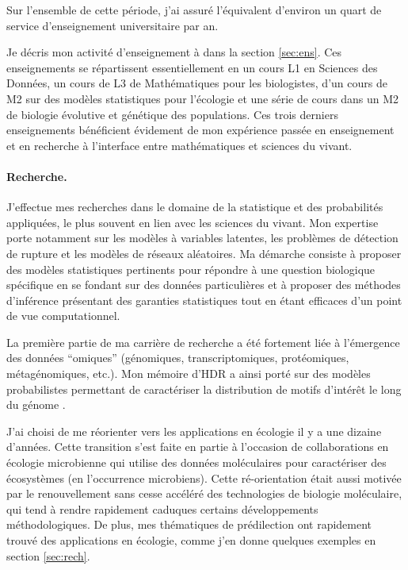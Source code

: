 Sur l'ensemble de cette période, j'ai assuré l'équivalent d'environ un quart de service d'enseignement universitaire par an.

\bigskip
Je décris mon activité d’enseignement à \SU dans la section \ref{sec:ens}. Ces enseignements se répartissent essentiellement en un cours L1 en Sciences des Données, un cours de L3 de Mathématiques pour les biologistes, d’un cours de M2 sur des modèles statistiques pour l’écologie et une série de cours dans un M2 de biologie évolutive et génétique des populations. Ces trois derniers enseignements bénéficient évidement de mon expérience passée en enseignement et en recherche à l’interface entre mathématiques et sciences du vivant.

\paragraph{Recherche.}
J’effectue mes recherches dans le domaine de la statistique et des probabilités appliquées, le plus souvent en lien avec les sciences du vivant. Mon expertise porte notamment sur les modèles à variables latentes, les problèmes de détection de rupture et les modèles de réseaux aléatoires. Ma démarche consiste à proposer des modèles statistiques pertinents pour répondre à une question biologique spécifique en se fondant sur des données particulières et à proposer des méthodes d’inférence présentant des garanties statistiques tout en étant efficaces d’un point de vue computationnel.

\bigskip
La première partie de ma carrière de recherche a été fortement liée à l’émergence des données “omiques” (génomiques, transcriptomiques, protéomiques, métagénomiques, etc.). Mon mémoire d’HDR a ainsi porté sur des modèles probabilistes permettant de caractériser la distribution de motifs d'intérêt le long du génome \cite{RRS06}.

\bigskip
J’ai choisi de me réorienter vers les applications en écologie il y a une dizaine d’années. Cette transition s’est faite en partie à l’occasion de collaborations en écologie microbienne qui utilise des données moléculaires pour caractériser des écosystèmes (en l'occurrence microbiens). Cette ré-orientation était aussi motivée par le renouvellement sans cesse accéléré des technologies de biologie moléculaire, qui tend à rendre rapidement caduques certains développements méthodologiques. De plus, mes thématiques de prédilection ont rapidement trouvé des applications en écologie, comme j’en donne quelques exemples en section \ref{sec:rech}.

